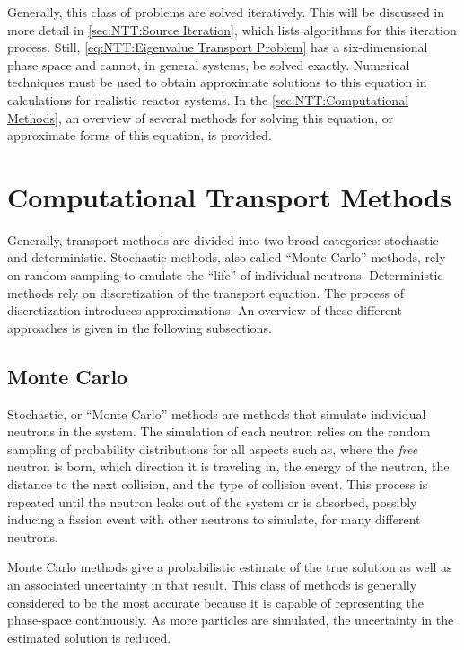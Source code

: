 {{    Generally, this class of problems are solved iteratively.
    This will be discussed in more detail in \cref{sec:NTT:Source Iteration}, which lists algorithms for this iteration process.
    Still, \cref{eq:NTT:Eigenvalue Transport Problem} has a six-dimensional phase space and cannot, in general systems, be solved exactly.
    Numerical techniques must be used to obtain approximate solutions to this equation in calculations for realistic reactor systems.
    In the \cref{sec:NTT:Computational Methods}, an overview of several methods for solving this equation, or approximate forms of this equation, is provided.
  }

  \section{Computational Transport Methods}{\label{sec:NTT:Computational Methods}
    Generally, transport methods are divided into two broad categories: stochastic and deterministic.
    Stochastic methods, also called ``Monte Carlo'' methods, rely on random sampling to emulate the ``life'' of individual neutrons.
    Deterministic methods rely on discretization of the transport equation.
    The process of discretization introduces approximations.
    An overview of these different approaches is given in the following subsections.

    \subsection{Monte Carlo}{\label{ssec:NTT:Monte Carlo}
      Stochastic, or ``Monte Carlo'' methods are methods that simulate individual neutrons in the system.
      The simulation of each neutron relies on the random sampling of probability distributions for all aspects such as, where the \emph{free} neutron is born, which direction it is traveling in, the energy of the neutron, the distance to the next collision, and the type of collision event.
      This process is repeated until the neutron leaks out of the system or is absorbed, possibly inducing a fission event with other neutrons to simulate, for many different neutrons.

      Monte Carlo methods give a probabilistic estimate of the true solution as well as an associated uncertainty in that result.
      This class of methods is generally considered to be the most accurate because it is capable of representing the phase-space continuously.
      As more particles are simulated, the uncertainty in the estimated solution is reduced.

}}}
